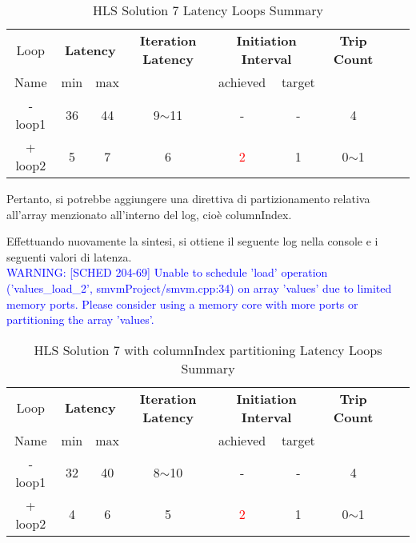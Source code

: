 \begin{table}[H]
	\centering
	\begin{tabular}{|c|c|c|c|c|c|c|c|c|}
		\hline
		\multicolumn{1}{|c|}{Loop} & \multicolumn{2}{|c|}{\textbf{Latency}} & \multicolumn{1}{c|}{\textbf{Iteration Latency}} & \multicolumn{2}{c|}{\textbf{Initiation Interval}} & \multicolumn{1}{c|}{\textbf{Trip Count}}  \\
		Name & min & max &  & achieved & target &  \\
		\hline
		- loop1 & 36 & 44 & 9$\sim$11 & - & - & 4 \\
		+ loop2 & 5 & 7 & 6 & \textcolor{red}{2} & 1 & 0$\sim$1 \\
		\hline
	\end{tabular}
	\caption{HLS Solution 7 Latency Loops Summary}
	\label{tab:hls-solution-7-loop-summary}
\end{table}

Pertanto, si potrebbe aggiungere una direttiva di partizionamento relativa all'array menzionato all'interno del log, cioè columnIndex.



Effettuando nuovamente la sintesi, si ottiene il seguente log nella console e i seguenti valori di latenza.
\\
\textcolor{blue}{WARNING: [SCHED 204-69] Unable to schedule 'load' operation ('values\_load\_2', smvmProject/smvm.cpp:34) on array 'values' due to limited memory ports. Please consider using a memory core with more ports or partitioning the array 'values'.}

\begin{table}[H]
	\centering
	\begin{tabular}{|c|c|c|c|c|c|c|c|c|}
		\hline
		\multicolumn{1}{|c|}{Loop} & \multicolumn{2}{|c|}{\textbf{Latency}} & \multicolumn{1}{c|}{\textbf{Iteration Latency}} & \multicolumn{2}{c|}{\textbf{Initiation Interval}} & \multicolumn{1}{c|}{\textbf{Trip Count}}  \\
		Name & min & max &  & achieved & target &  \\
		\hline
		- loop1 & 32 & 40 & 8$\sim$10 & - & - & 4 \\
		+ loop2 & 4 & 6 & 5 & \textcolor{red}{2} & 1 & 0$\sim$1 \\
		\hline
	\end{tabular}
	\caption{HLS Solution 7 with columnIndex partitioning Latency Loops Summary}
	\label{tab:hls-solution-7-columnindex-partitioning-loop-summary}
\end{table}

